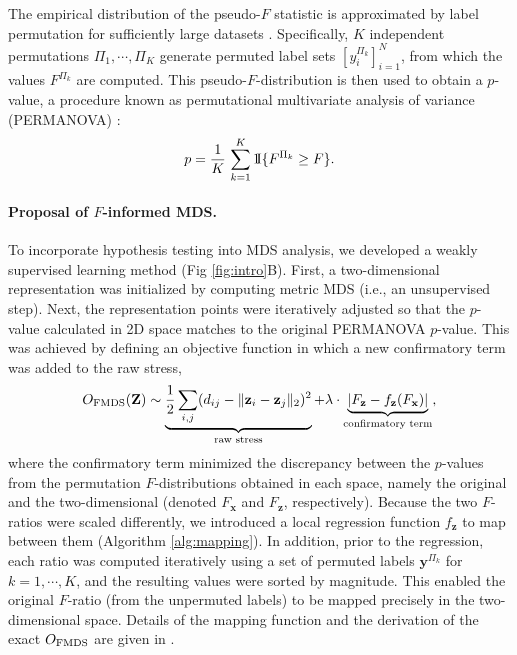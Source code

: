 \documentclass[10pt,letterpaper]{article}
\newcommand{\1}{{\rm 1}\kern-0.24em{\rm I}}
\begin{document}
The empirical distribution of the pseudo-$F$ statistic is approximated by label permutation for sufficiently large datasets \cite{holmes96, gijbels13}.
Specifically, $K$ independent permutations $\Pi_1 , \cdots ,\Pi_K$ generate permuted label sets $[y_i^{\Pi_k}]_{i=1}^{N}$, from which the values $F^{\Pi_k}$ are computed. This pseudo-$F$-distribution is then used to obtain a $p$-value, a procedure known as permutational multivariate analysis of variance (PERMANOVA) \cite{anderson01}:
\begin{equation}
p = \frac{1}{K}\,\sum_{k=1}^{K}\1\{F^{\Pi_k}\geq F\}.
\end{equation}

\paragraph*{Proposal of $F$-informed MDS.}
To incorporate hypothesis testing into MDS analysis, we developed a weakly supervised learning method (Fig \ref{fig:intro}B).
First, a two-dimensional representation was initialized by computing metric MDS (i.e., an unsupervised step).
Next, the representation points were iteratively adjusted so that the $p$-value calculated in 2D space matches to the original PERMANOVA $p$-value.
This was achieved by defining an objective function in which a new confirmatory term was added to the raw stress,
\begin{equation} \label{eq:fmds}
    O_{\rm FMDS}(\mathbf{Z}) \sim
    \underbrace{\frac{1}{2}\sum_{i,j} (d_{ij} - \| \mathbf{z}_i - \mathbf{z}_j \|_2 )^2}_\text{raw stress} +
    \lambda\cdot \underbrace{\left|F_\mathbf{z} - f_\mathbf{z}(F_\mathbf{x})\right|}_\text{confirmatory term},
\end{equation}
where the confirmatory term minimized the discrepancy between the $p$-values from the permutation $F$-distributions obtained in each space, namely the original and the two-dimensional (denoted $F_\mathbf{x}$ and $F_\mathbf{z}$, respectively).
Because the two $F$-ratios were scaled differently, we introduced a local regression function $f_\mathbf{z}$ to map between them (Algorithm \ref{alg:mapping}). In addition, prior to the regression, each ratio was computed iteratively using a set of permuted labels $\mathbf{y}^{\Pi_k}$ for $k=1, \cdots, K$, and the resulting values were sorted by magnitude. This enabled the original $F$-ratio (from the unpermuted labels) to be mapped precisely in the two-dimensional space.
Details of the mapping function and the derivation of the exact $O_{\rm FMDS}$ are given in .
\end{document}
